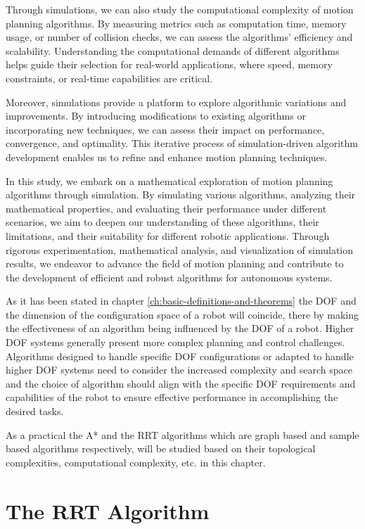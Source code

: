Through simulations, we can also study the computational complexity of motion planning algorithms. By measuring metrics such as computation time, memory usage, or number of collision checks, we can assess the algorithms' efficiency and scalability. Understanding the computational demands of different algorithms helps guide their selection for real-world applications, where speed, memory constraints, or real-time capabilities are critical.

Moreover, simulations provide a platform to explore algorithmic variations and improvements. By introducing modifications to existing algorithms or incorporating new techniques, we can assess their impact on performance, convergence, and optimality. This iterative process of simulation-driven algorithm development enables us to refine and enhance motion planning techniques.

In this study, we embark on a mathematical exploration of motion planning algorithms through simulation. By simulating various algorithms, analyzing their mathematical properties, and evaluating their performance under different scenarios, we aim to deepen our understanding of these algorithms, their limitations, and their suitability for different robotic applications. Through rigorous experimentation, mathematical analysis, and visualization of simulation results, we endeavor to advance the field of motion planning and contribute to the development of efficient and robust algorithms for autonomous systems.

As it has been stated in chapter \ref{ch:basic-definitions-and-theorems} the DOF and the dimension of the configuration space of a robot will coincide, there by making the effectiveness of an algorithm being influenced by the DOF of a robot. Higher DOF systems generally present more complex planning and control challenges. Algorithms designed to handle specific DOF configurations or adapted to handle higher DOF systems need to consider the increased complexity and search space and the choice of algorithm should align with the specific DOF requirements and capabilities of the robot to ensure effective performance in accomplishing the desired tasks.

As a practical the A* and the RRT algorithms which are graph based and sample based algorithms respectively, will be studied based on their topological complexities, computational complexity, etc. in this chapter.

\section{The RRT Algorithm}

